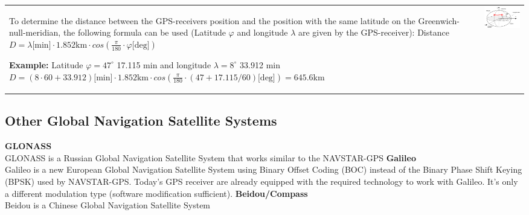 	\begin{tabular}{ll}
		\parbox{11cm}{
			To determine the distance between the GPS-receivers position and the position with the same 
			latitude on the Greenwich-null-meridian, the following formula can be used 
			(Latitude $\varphi$ and longitude $\lambda$ are given by the GPS-receiver):\\
			Distance $D = \lambda \text{[min]} \cdot 1.852 \text{km} \cdot cos(\frac{\pi}{180}\cdot \varphi \text{[deg]}) $ \\
			
			\textbf{Example:}
			Latitude $\varphi = 47^\circ$ 17.115 min and longitude $\lambda = 8^\circ$ 33.912 min \\
			$D = (8\cdot 60 + 33.912) \text{[min]} \cdot 1.852 \text{km} \cdot cos(\frac{\pi}{180}\cdot (47 + 17.115/60) \text{[deg]}) = 645.6$km
		}	
		& \parbox{7cm}{
			\includegraphics[width=7cm]{./bilder/gps-distance.png}\\ 
		}
	\end{tabular}


\subsection{Other Global Navigation Satellite Systems}
\textbf{GLONASS} \\
	GLONASS is a Russian Global Navigation Satellite System that works similar to the NAVSTAR-GPS
\textbf{Galileo} \\
	Galileo is a new European Global Navigation Satellite System using Binary Offset Coding (BOC) instead of the Binary Phase Shift Keying (BPSK) 
	used by NAVSTAR-GPS. Today's GPS receiver are already equipped with the required technology to work with Galileo. It's only a 
	different modulation type (software modification sufficient).
\textbf{Beidou/Compass} \\
	Beidou is a Chinese Global Navigation Satellite System